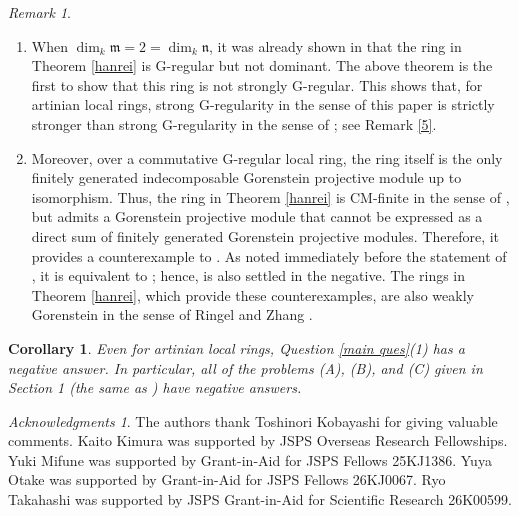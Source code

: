 \documentclass{amsart}
\newtheorem{cor}[thm]{Corollary}
\theoremstyle{definition}
\theoremstyle{remark}
\newtheorem{rem}[thm]{Remark}
\newtheorem*{ac}{Acknowledgments}
\numberwithin{equation}{thm}
\def\m{\mathfrak{m}}
\def\n{\mathfrak{n}}
\begin{document}
\begin{rem}
\begin{enumerate}[(1)]
\item When $\dim_k\m=2=\dim_k\n$, it was already shown in \cite[Remark 9.8]{T23} that the ring in Theorem \ref{hanrei} is G-regular but not dominant. The above theorem is the first to show that this ring is not strongly G-regular. This shows that, for artinian local rings, strong G-regularity in the sense of this paper is strictly stronger than strong G-regularity in the sense of \cite{AV}; see Remark \ref{5}.

\item Moreover, over a commutative G-regular local ring, the ring itself is the only finitely generated indecomposable Gorenstein projective module up to isomorphism. Thus, the ring in Theorem \ref{hanrei} is CM-finite in the sense of \cite{Che17}, but admits a Gorenstein projective module that cannot be expressed as a direct sum of finitely generated Gorenstein projective modules. Therefore, it provides a counterexample to \cite[Problem A]{Che17}. As noted immediately before the statement of \cite[Problem B]{Che17}, it is equivalent to \cite[Problem A]{Che17}; hence, \cite[Problem B]{Che17} is also settled in the negative. The rings in Theorem \ref{hanrei}, which provide these counterexamples, are also weakly Gorenstein in the sense of Ringel and Zhang \cite{RZ}.
\end{enumerate}
\end{rem}

\begin{cor}\label{counterex}
Even for artinian local rings, Question \ref{main ques}(1) has a negative answer. In particular, all of the problems (A), (B), and (C) given in Section 1 (the same as \cite[Problems A,B,C]{Che17}) have negative answers.
\end{cor}

\begin{ac}
The authors thank Toshinori Kobayashi for giving valuable comments.
Kaito Kimura was supported by JSPS Overseas Research Fellowships.
Yuki Mifune was supported by Grant-in-Aid for JSPS Fellows 25KJ1386.
Yuya Otake was supported by Grant-in-Aid for JSPS Fellows 26KJ0067.
Ryo Takahashi was supported by JSPS Grant-in-Aid for Scientific Research 26K00599.
\end{ac}
\end{document}
